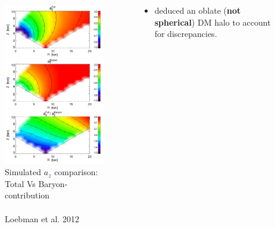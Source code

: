 \documentclass[xcolor=dvipsnames]{beamer}
\begin{document}
\begin{frame}

\begin{columns}[c]

\begin{column}{.5\textwidth}
\begin{figure}
\includegraphics[width=1\linewidth]{./pics/loebmanAccelerationCurves.png}
\caption{\tiny Simulated $a_z$ comparison: Total Vs Baryon-contribution \\~\\\tiny Loebman et al. 2012}
\end{figure}
\end{column}

\begin{column}{.6\textwidth}
\centering
\small
\begin{itemize}

\item \cite[Loebman et al. 2012]{Loebman2012} deduced an oblate (\textbf{not spherical}) DM halo to account for discrepancies.

\end{itemize}

\end{column}

\end{columns}

\end{frame}
\end{document}
